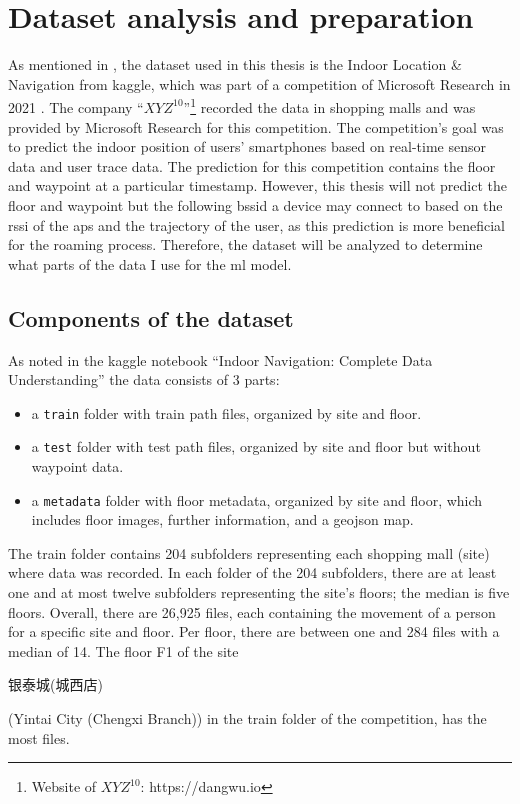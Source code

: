 \chapter{Dataset analysis and preparation}\label{ch:data-ana}

As mentioned in , the dataset used in this thesis is the Indoor Location \& Navigation from kaggle, which was part of a competition of Microsoft Research in 2021 \cite{IndoorLocationNavigation}.
The company ``\(XYZ^{10}\)''\footnote{Website of \(XYZ^{10}\): https://dangwu.io} recorded the data in shopping malls and was provided by Microsoft Research for this competition.
The competition's goal was to predict the indoor position of users' smartphones based on real-time sensor data and user trace data.
The prediction for this competition contains the floor and waypoint at a particular timestamp.
However, this thesis will not predict the floor and waypoint but the following \ac{bssid} a device may connect to based on the \ac{rssi} of the \acp{ap} and the trajectory of the user, as this prediction is more beneficial for the roaming process.
Therefore, the dataset will be analyzed to determine what parts of the data I use for the \ac{ml} model.

\section{Components of the dataset}\label{sec:data}
As noted in the kaggle notebook ``Indoor Navigation: Complete Data Understanding'' \cite{IndoorNavigationUnderstanding} the data consists of 3 parts:

\begin{itemize}
    \item a \texttt{train} folder with train path files, organized by site and floor.
    \item a \texttt{test} folder with test path files, organized by site and floor but without waypoint data.
    \item a \texttt{metadata} folder with floor metadata, organized by site and floor, which includes floor images, further information, and a geojson map.
\end{itemize}

The train folder contains 204 subfolders representing each shopping mall (site) where data was recorded.
In each folder of the 204 subfolders, there are at least one and at most twelve subfolders representing the site's floors; the median is five floors.
Overall, there are 26,925 files, each containing the movement of a person for a specific site and floor.
Per floor, there are between one and 284 files with a median of 14.
The floor F1 of the site \begin{CJK*}{UTF8}{gbsn}银泰城(城西店)\end{CJK*} (Yintai City (Chengxi Branch)) in the train folder of the competition, has the most files.

